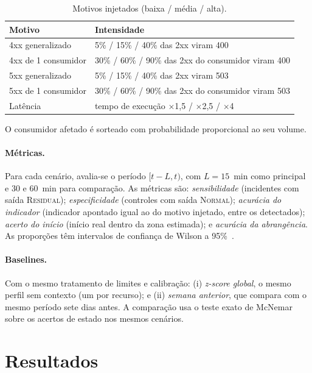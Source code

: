 \documentclass[sigconf,nonacm]{acmart}
\newcommand{\Normal}{\textsc{Normal}\xspace}
\newcommand{\Residual}{\textsc{Residual}\xspace}
\begin{document}
\begin{table}[t]
  \caption{Motivos injetados (baixa / média / alta).}
  \label{tab:falhas}
  \small
  \begin{tabular}{p{}p{}}
    \toprule
    Motivo & Intensidade \\
    \midrule
    4xx generalizado & 5\% / 15\% / 40\% das 2xx viram 400 \\
    4xx de 1 consumidor & 30\% / 60\% / 90\% das 2xx do consumidor viram 400 \\
    5xx generalizado & 5\% / 15\% / 40\% das 2xx viram 503 \\
    5xx de 1 consumidor & 30\% / 60\% / 90\% das 2xx do consumidor viram 503 \\
    Latência & tempo de execução $\times$1,5 / $\times$2,5 / $\times$4 \\
    \bottomrule
  \end{tabular}
  \par\smallskip\footnotesize O consumidor afetado é sorteado com probabilidade proporcional ao seu volume.
\end{table}

\paragraph{Métricas.} Para cada cenário, avalia-se o período $[t-L,t)$, com $L=15$~min como principal e 30 e 60~min para comparação. As métricas são: \emph{sensibilidade} (incidentes com saída \Residual); \emph{especificidade} (controles com saída \Normal); \emph{acurácia do indicador} (indicador apontado igual ao do motivo injetado, entre os detectados); \emph{acerto do início} (início real dentro da zona estimada); e \emph{acurácia da abrangência}. As proporções têm intervalos de confiança de Wilson a 95\%~\citep{wilson1927probable}.

\paragraph{Baselines.} Com o mesmo tratamento de limites e calibração: (i) \emph{z-score global}, o mesmo perfil sem contexto (um por recurso); e (ii) \emph{semana anterior}, que compara com o mesmo período sete dias antes. A comparação usa o teste exato de McNemar~\citep{mcnemar1947note} sobre os acertos de estado nos mesmos cenários.

\section{Resultados}\label{sec:resultados}
\end{document}
